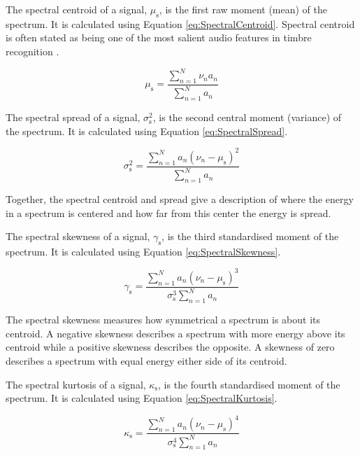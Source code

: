 			The spectral centroid of a signal, $\mu_{\textrm{s}}$, is the first raw moment (mean) of the
			spectrum. It is calculated using Equation \ref{eq:SpectralCentroid}. Spectral centroid is often
			stated as being one of the most salient audio features in timbre recognition
			\citep{freed1990auditory, lakatos2000a}. 

			\begin{equation}
				\mu_{\textrm{s}} = \frac{\sum_{n = 1}^{N} \nu_{n}a_{n}}
					   	   {\sum_{n = 1}^{N} a_{n}}
				\label{eq:SpectralCentroid}
			\end{equation}

			The spectral spread of a signal, $\sigma_{\textrm{s}}^{2}$, is the second central moment (variance)
			of the spectrum. It is calculated using Equation \ref{eq:SpectralSpread}.

			\begin{equation}
				\sigma_{\textrm{s}}^{2} = \frac{\sum_{n = 1}^{N} a_{n}(\nu_{n} - \mu_{\textrm{s}})^{2}}
						  	  {\sum_{n = 1}^{N} a_{n}}
				\label{eq:SpectralSpread}
			\end{equation}

			Together, the spectral centroid and spread give a description of where the energy in a spectrum is
			centered and how far from this center the energy is spread.

			The spectral skewness of a signal, $\gamma_{\textrm{s}}$, is the third standardised moment of the
			spectrum. It is calculated using Equation \ref{eq:SpectralSkewness}.

			\begin{equation}
				\gamma_{\textrm{s}} = \frac{\sum_{n = 1}^{N} a_{n}(\nu_{n} - \mu_{\textrm{s}})^{3}}
					{\sigma_{\textrm{s}}^{3}\sum_{n = 1}^{N} a_{n}}
				\label{eq:SpectralSkewness}
			\end{equation}

			The spectral skewness measures how symmetrical a spectrum is about its centroid. A negative
			skewness describes a spectrum with more energy above its centroid while a positive skewness
			describes the opposite. A skewness of zero describes a spectrum with equal energy either side of
			its centroid.

			The spectral kurtosis of a signal, $\kappa_{\textrm{s}}$, is the fourth standardised moment of the
			spectrum. It is calculated using Equation \ref{eq:SpectralKurtosis}.

			\begin{equation}
				\kappa_{\textrm{s}} = \frac{\sum_{n = 1}^{N} a_{n}(\nu_{n} - \mu_{\textrm{s}})^{4}}
					{\sigma_{\textrm{s}}^{4}\sum_{n = 1}^{N} a_{n}}
				\label{eq:SpectralKurtosis}
			\end{equation}


